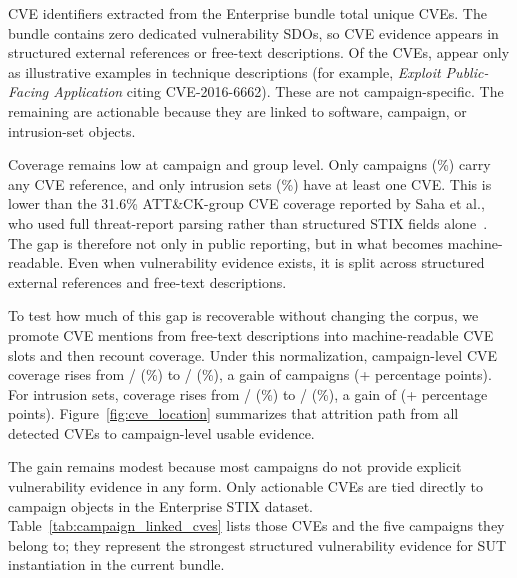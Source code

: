 \documentclass[sigconf]{acmart}
\begin{document}
CVE identifiers extracted from the Enterprise bundle total \cveuniquecount{} unique CVEs. The bundle contains zero dedicated vulnerability SDOs, so CVE evidence appears in structured external references or free-text descriptions. Of the \cveuniquecount{} CVEs, \cvetechniqueonlycount{} appear only as illustrative examples in technique descriptions (for example, \emph{Exploit Public-Facing Application} citing CVE-2016-6662). These are not campaign-specific. The remaining \cveactionablecount{} are actionable because they are linked to software, campaign, or intrusion-set objects.

Coverage remains low at campaign and group level. Only \entcampaignswithcvecount{} campaigns (\entcampaignswithcvepct\%) carry any CVE reference, and only \entintrusionsetswithcvecount{} intrusion sets (\entintrusionsetswithcvepct\%) have at least one CVE. This is lower than the 31.6\% ATT\&CK-group CVE coverage reported by Saha et al., who used full threat-report parsing rather than structured STIX fields alone~\cite{DBLP:conf/uss/SahaMBCVL25}. The gap is therefore not only in public reporting, but in what becomes machine-readable. Even when vulnerability evidence exists, it is split across structured external references and free-text descriptions.

To test how much of this gap is recoverable without changing the corpus, we promote CVE mentions from free-text descriptions into machine-readable CVE slots and then recount coverage. Under this normalization, campaign-level CVE coverage rises from \entcampaignswithcvestructuredcount{}/\enterpriseactivecampaigncount{} (\entcampaignswithcvestructuredpct\%) to \entcampaignswithcvecount{}/\enterpriseactivecampaigncount{} (\entcampaignswithcvepct\%), a gain of \entcampaignswithcveenrichmentgaincount{} campaigns (+\entcampaignswithcveenrichmentgainpp{} percentage points). For intrusion sets, coverage rises from \entintrusionsetswithcvestructuredcount{}/\enterpriseactiveintrusionsetcount{} (\entintrusionsetswithcvestructuredpct\%) to \entintrusionsetswithcvecount{}/\enterpriseactiveintrusionsetcount{} (\entintrusionsetswithcvepct\%), a gain of \entintrusionsetswithcveenrichmentgaincount{} (+\entintrusionsetswithcveenrichmentgainpp{} percentage points). Figure~\ref{fig:cve_location} summarizes that attrition path from all detected CVEs to campaign-level usable evidence.

The gain remains modest because most campaigns do not provide explicit vulnerability evidence in any form. Only \campaignlinkedcvecount{} actionable CVEs are tied directly to campaign objects in the Enterprise STIX dataset. Table~\ref{tab:campaign_linked_cves} lists those CVEs and the five campaigns they belong to; they represent the strongest structured vulnerability evidence for SUT instantiation in the current bundle.
\end{document}
